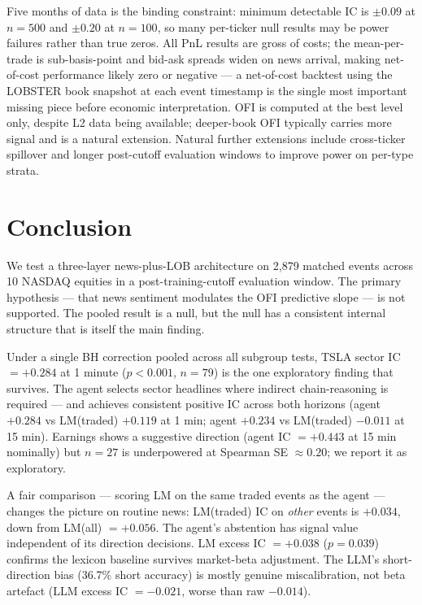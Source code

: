 \documentclass[11pt, letterpaper]{article}
\begin{document}
Five months of data is the binding constraint: minimum detectable IC is $\pm 0.09$
at $n = 500$ and $\pm 0.20$ at $n = 100$, so many per-ticker null results may be
power failures rather than true zeros. All PnL results are gross of costs; the
mean-per-trade is sub-basis-point and bid-ask spreads widen on news arrival, making
net-of-cost performance likely zero or negative --- a net-of-cost backtest using
the LOBSTER book snapshot at each event timestamp is the single most important missing
piece before economic interpretation. OFI is computed at the best level only, despite
L2 data being available; deeper-book OFI typically carries more signal
\citep{cont2014price} and is a natural extension. Natural further extensions include
cross-ticker spillover and longer post-cutoff evaluation windows to improve power on
per-type strata.

\section{Conclusion}
\label{sec:conclusion}

We test a three-layer news-plus-LOB architecture on 2,879 matched events across 10
NASDAQ equities in a post-training-cutoff evaluation window. The primary hypothesis
--- that news sentiment modulates the OFI predictive slope --- is not supported. The
pooled result is a null, but the null has a consistent internal structure that is
itself the main finding.

Under a single BH correction pooled across all subgroup tests, TSLA sector IC
$= +0.284$ at 1 minute ($p < 0.001$, $n = 79$) is the one exploratory finding that
survives. The agent selects sector headlines where indirect chain-reasoning is required
--- and achieves consistent positive IC across both horizons (agent $+0.284$ vs
LM(traded) $+0.119$ at 1 min; agent $+0.234$ vs LM(traded) $-0.011$ at 15 min). Earnings shows a suggestive direction (agent IC
$= +0.443$ at 15 min nominally) but $n = 27$ is underpowered at Spearman SE $\approx
0.20$; we report it as exploratory.

A fair comparison --- scoring LM on the same traded events as the agent --- changes
the picture on routine news: LM(traded) IC on \textit{other} events is $+0.034$, down
from LM(all) $= +0.056$. The agent's abstention has signal value independent of its
direction decisions. LM excess IC $= +0.038$ ($p = 0.039$) confirms the lexicon
baseline survives market-beta adjustment. The LLM's short-direction bias
(36.7\% short accuracy) is mostly genuine miscalibration, not beta artefact (LLM
excess IC $= -0.021$, worse than raw $-0.014$).
\end{document}
